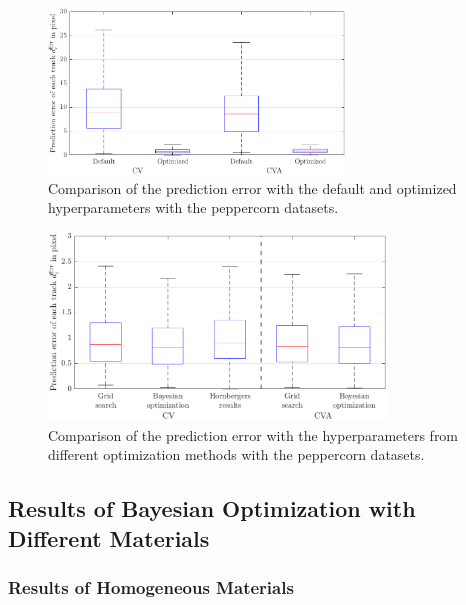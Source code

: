 \begin{figure}[htbp]
\centering
\includegraphics[width=0.7\textwidth]{figures/KF/bayopt/effect opt4.png}
\caption{Comparison of the prediction error with the default and optimized hyperparameters with the peppercorn datasets.}
\label{opt effect1}
\end{figure}

\begin{figure}[htbp]
\centering
\includegraphics[width=0.8\textwidth]{figures/KF/bayopt/effect opt3.png}
\caption{Comparison of the prediction error with the hyperparameters from different optimization methods with the peppercorn datasets.}
\label{opt effect2}
\end{figure}

\subsection{Results of Bayesian Optimization with Different Materials}
\label{Test of Different Materials}
\subsubsection{Results of Homogeneous Materials}

